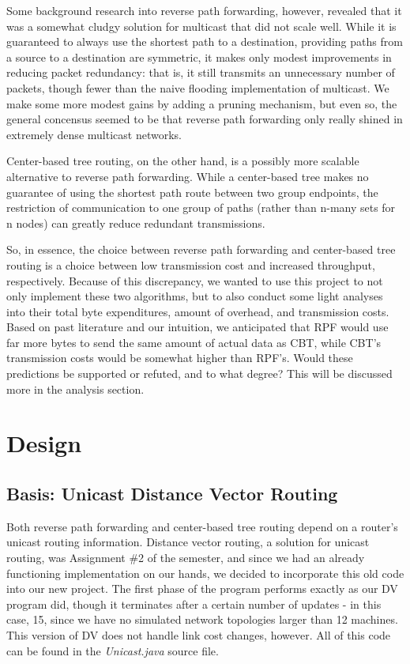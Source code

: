 \documentclass[11pt]{article}
\begin{document}
    Some background research into reverse path forwarding, however, revealed that it was a somewhat cludgy solution for multicast that did not scale well. While it is guaranteed to always use the shortest path to a destination, providing paths from a source to a destination are symmetric, it makes only modest improvements in reducing packet redundancy: that is, it still transmits an unnecessary number of packets, though fewer than the naive flooding implementation of multicast. We make some more modest gains by adding a pruning mechanism, but even so, the general concensus seemed to be that reverse path forwarding only really shined in extremely dense multicast networks.
    
    Center-based tree routing, on the other hand, is a possibly more scalable alternative to reverse path forwarding. While a center-based tree makes no guarantee of using the shortest path route between two group endpoints, the restriction of communication to one group of paths (rather than n-many sets for n nodes) can greatly reduce redundant transmissions.
    
    So, in essence, the choice between reverse path forwarding and center-based tree routing is a choice between low transmission cost and increased throughput, respectively. Because of this discrepancy, we wanted to use this project to not only implement these two algorithms, but to also conduct some light analyses into their total byte expenditures, amount of overhead, and transmission costs. Based on past literature and our intuition, we anticipated that RPF would use far more bytes to send the same amount of actual data as CBT, while CBT's transmission costs would be somewhat higher than RPF's. Would these predictions be supported or refuted, and to what degree? This will be discussed more in the analysis section.
  
  \section{Design}
    \subsection{Basis: Unicast Distance Vector Routing}
      Both reverse path forwarding and center-based tree routing depend on a router's unicast routing information. Distance vector routing, a solution for unicast routing, was Assignment \#2 of the semester, and since we had an already functioning implementation on our hands, we decided to incorporate this old code into our new project. The first phase of the program performs exactly as our DV program did, though it terminates after a certain number of updates - in this case, 15, since we have no simulated network topologies larger than 12 machines. This version of DV does not handle link cost changes, however. All of this code can be found in the \emph{Unicast.java} source file.
      
\end{document}

